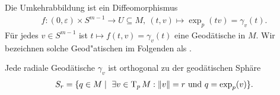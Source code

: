 Die Umkehrabbildung ist ein Diffeomorphismus
\begin{align*}
  f \colon (0, \varepsilon) \times S^{m-1} \to U \subseteq M, \ 
  (t,v) \mapsto \exp_p(tv) = \gamma_v(t).
\end{align*}
Für jedes $v \in S^{m-1}$ ist $t \mapsto f(t,v) = \gamma_v(t)$ eine Geodätische in $M$. Wir bezeichnen solche Geod"atischen im Folgenden als .

\begin{Lemma}
  Jede radiale Geodätische $\gamma_v$ ist orthogonal zu der geodätischen Sphäre
  \begin{align*}
    S_r = \{q \in M \mid \ \exists v \in \operatorname{T}_pM: \|v\| = r \text{ und } q = \exp_p(v) \}.
  \end{align*}
\end{Lemma}

